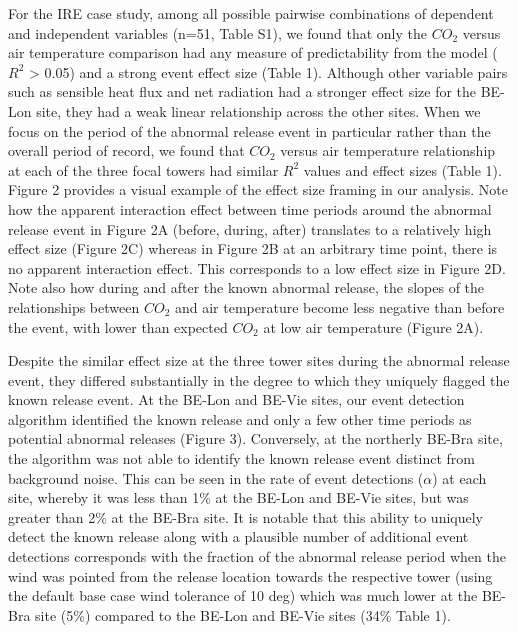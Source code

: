 \documentclass{article}
\begin{document}
For the IRE case study, among all possible pairwise combinations of dependent and independent variables (n=51, Table S1), we found that only the $CO_2$ versus air temperature comparison had any measure of predictability from the model ($R^2$ > 0.05) and a strong event effect size (Table 1). Although other variable pairs such as sensible heat flux and net radiation had a stronger effect size for the BE-Lon site, they had a weak linear relationship across the other sites. When we focus on the period of the abnormal release event in particular rather than the overall period of record, we found that $CO_2$ versus air temperature relationship at each of the three focal towers had similar $R^2$ values and effect sizes (Table 1). Figure 2 provides a visual example of the effect size framing in our analysis. Note how the apparent interaction effect between time periods around the abnormal release event in Figure 2A (before, during, after) translates to a relatively high effect size (Figure 2C) whereas in Figure 2B at an arbitrary time point, there is no apparent interaction effect. This corresponds to a low effect size in Figure 2D. Note also how during and after the known abnormal release, the slopes of the relationships between $CO_2$ and air temperature become less negative than before the event, with lower than expected $CO_2$ at low air temperature (Figure 2A).

Despite the similar effect size at the three tower sites during the abnormal release event, they differed substantially in the degree to which they uniquely flagged the known release event. At the BE-Lon and BE-Vie sites, our event detection algorithm identified the known release and only a few other time periods as potential abnormal releases (Figure 3). Conversely, at the northerly BE-Bra site, the algorithm was not able to identify the known release event distinct from background noise. This can be seen in the rate of event detections ($\alpha$) at each site, whereby it was less than 1\% at the BE-Lon and BE-Vie sites, but was greater than 2\% at the BE-Bra site. It is notable that this ability to uniquely detect the known release along with a plausible number of additional event detections corresponds with the fraction of the abnormal release period when the wind was pointed from the release location towards the respective tower (using the default base case wind tolerance of 10 deg) which was much lower at the BE-Bra site (5\%) compared to the BE-Lon and BE-Vie sites (34\% Table 1). 
\end{document}
